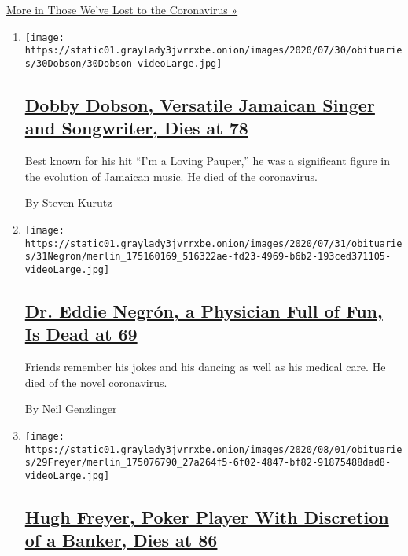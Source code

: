 \href{/series/people-died-coronavirus-obituaries}{More in Those We've
Lost to the Coronavirus »}

\begin{enumerate}
\def\labelenumi{\arabic{enumi}.}
\item
  \texttt{[image: https://static01.graylady3jvrrxbe.onion/images/2020/07/30/obituaries/30Dobson/30Dobson-videoLarge.jpg]}

  \hypertarget{dobby-dobson-versatile-jamaican-singer-and-songwriter-dies-at-78}{%
  \subsection{\texorpdfstring{\href{/2020/07/31/obituaries/dobby-dobson-dead-coronavirus.html}{Dobby
  Dobson, Versatile Jamaican Singer and Songwriter, Dies at
  78}}{Dobby Dobson, Versatile Jamaican Singer and Songwriter, Dies at 78}}\label{dobby-dobson-versatile-jamaican-singer-and-songwriter-dies-at-78}}

  Best known for his hit ``I'm a Loving Pauper,'' he was a significant
  figure in the evolution of Jamaican music. He died of the coronavirus.

  By Steven Kurutz
\item
  \texttt{[image: https://static01.graylady3jvrrxbe.onion/images/2020/07/31/obituaries/31Negron/merlin\_175160169\_516322ae-fd23-4969-b6b2-193ced371105-videoLarge.jpg]}

  \hypertarget{dr-eddie-negruxf3n-a-physician-full-of-fun-is-dead-at-69}{%
  \subsection{\texorpdfstring{\href{/2020/08/01/obituaries/eddie-negron-dead-coronavirus.html}{Dr.
  Eddie Negrón, a Physician Full of Fun, Is Dead at
  69}}{Dr. Eddie Negrón, a Physician Full of Fun, Is Dead at 69}}\label{dr-eddie-negruxf3n-a-physician-full-of-fun-is-dead-at-69}}

  Friends remember his jokes and his dancing as well as his medical
  care. He died of the novel coronavirus.

  By Neil Genzlinger
\item
  \texttt{[image: https://static01.graylady3jvrrxbe.onion/images/2020/08/01/obituaries/29Freyer/merlin\_175076790\_27a264f5-6f02-4847-bf82-91875488dad8-videoLarge.jpg]}

  \hypertarget{hugh-freyer-poker-player-with-discretion-of-a-banker-dies-at-86}{%
  \subsection{\texorpdfstring{\href{/2020/07/30/obituaries/hugh-freyer-dead-coronavirus.html}{Hugh
  Freyer, Poker Player With Discretion of a Banker, Dies at
  86}}{Hugh Freyer, Poker Player With Discretion of a Banker, Dies at 86}}\label{hugh-freyer-poker-player-with-discretion-of-a-banker-dies-at-86}}


\end{enumerate}
